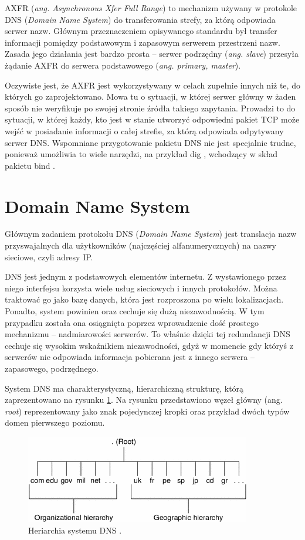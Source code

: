 AXFR (\textit{ang. Asynchronous Xfer Full Range}) \cite{RFC1034, RFC1035} to mechanizm używany w protokole DNS (\textit{Domain Name System}) do
transferowania strefy, za którą odpowiada serwer nazw. Głównym przeznaczeniem opisywanego standardu był transfer informacji pomiędzy
podstawowym i zapasowym serwerem przestrzeni nazw. Zasada jego działania jest bardzo prosta -- serwer podrzędny (\textit{ang. slave})
przesyła żądanie AXFR do serwera podstawowego (\textit{ang. primary, master}).

Oczywiste jest, że AXFR jest wykorzystywany w celach zupełnie innych niż te, do których go zaprojektowano. Mowa tu o sytuacji,
w której serwer główny w żaden sposób nie weryfikuje po swojej stronie źródła takiego zapytania. Prowadzi to do sytuacji, w której
każdy, kto jest w stanie utworzyć odpowiedni pakiet TCP może wejść w posiadanie informacji o całej strefie, za którą odpowiada
odpytywany serwer DNS. Wspomniane przygotowanie pakietu DNS nie jest specjalnie trudne, ponieważ umożliwia to wiele narzędzi, na
przykład dig \cite{dig}, wchodzący w skład pakietu bind \cite{isc}.

\section{Domain Name System}
Głównym zadaniem protokołu DNS (\textit{Domain Name System}) \cite{RFC1035} jest translacja nazw przyswajalnych dla użytkowników (najczęściej
alfanumerycznych) na nazwy sieciowe, czyli adresy IP.

DNS jest jednym z podstawowych elementów internetu. Z wystawionego przez niego interfejsu korzysta wiele usług sieciowych i innych
protokołów. Można traktować go jako bazę danych, która jest rozproszona po wielu lokalizacjach. Ponadto, system powinien oraz
cechuje się dużą niezawodnością. W tym przypadku została ona osiągnięta poprzez wprowadzenie dość prostego mechanizmu -- nadmiarowości
serwerów. To właśnie dzięki tej redundancji DNS cechuje się wysokim wskaźnikiem niezawodności, gdyż w momencie gdy któryś z serwerów
nie odpowiada informacja pobierana jest z innego serwera -- zapasowego, podrzędnego.

System DNS ma charakterystyczną, hierarchiczną strukturę, którą zaprezentowano na rysunku \ref{hierarchy_dns}. Na rysunku
przedstawiono węzeł główny (ang. \textit{root}) reprezentowany jako znak pojedynczej kropki oraz przykład dwóch typów domen
pierwszego poziomu.

\begin{center}
	\begin{figure}
	\includegraphics[scale=1]{image/hierarchy_dns}
	\caption{Heriarchia systemu DNS \cite{hierarchy_dns}.}
	\label{hierarchy_dns}
	\end{figure}
\end{center}

